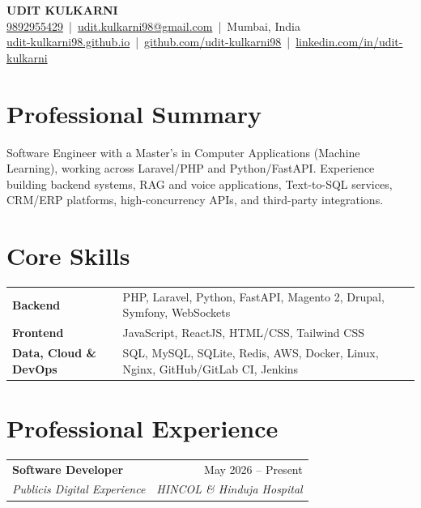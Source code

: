 \documentclass[10pt,a4paper]{article}
\makeatletter
\newcommand{\resumeSubheading}[4]{
  \vspace{1pt}
  \begin{tabularx}{\textwidth}{@{}X r@{}}
    \textbf{#1} & #2 \\
    \textit{#3} & \textit{#4}
  \end{tabularx}
  \vspace{-3pt}
}
\newcommand{\link}[2]{\href{#1}{#2}}
\makeatother
\begin{document}
\begin{center}
    {\LARGE \textbf{UDIT KULKARNI}}\\[3pt]
    \link{tel:9892955429}{9892955429}
    \,|\, \link{mailto:udit.kulkarni98@gmail.com}{udit.kulkarni98@gmail.com}
    \,|\, Mumbai, India\\
    \link{https://udit-kulkarni98.github.io/}{udit-kulkarni98.github.io}
    \,|\, \link{https://github.com/udit-kulkarni98}{github.com/udit-kulkarni98}
    \,|\, \link{https://www.linkedin.com/in/udit-kulkarni/}{linkedin.com/in/udit-kulkarni}
\end{center}

\section{Professional Summary}
Software Engineer with a Master's in Computer Applications (Machine Learning), working across Laravel/PHP and Python/FastAPI. Experience building backend systems, RAG and voice applications, Text-to-SQL services, CRM/ERP platforms, high-concurrency APIs, and third-party integrations.

\section{Core Skills}
\begin{tabularx}{\textwidth}{@{}>{\bfseries}l X@{}}
Backend & PHP, Laravel, Python, FastAPI, Magento 2, Drupal, Symfony, WebSockets \\
Frontend & JavaScript, ReactJS, HTML/CSS, Tailwind CSS \\
Data, Cloud \& DevOps & SQL, MySQL, SQLite, Redis, AWS, Docker, Linux, Nginx, GitHub/GitLab CI, Jenkins \\
\end{tabularx}

\section{Professional Experience}

\resumeSubheading
  {Software Developer}
  {May 2026 -- Present}
  {Publicis Digital Experience}
  {HINCOL \& Hinduja Hospital}
\end{document}
